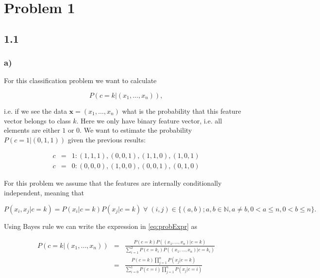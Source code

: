 \documentclass[table,xcdraw]{article}
\begin{document}




\section*{Problem 1}
\subsection*{1.1}

\subsubsection*{a)}

For this classification problem we want to calculate

\begin{equation}
P(c=k|(x_1,\dots,x_n)),
\label{eq:probExpr}
\end{equation}

i.e. if we see the data $\bm{x}=(x_1,\dots,x_n)$ what is the probability that this feature vector belongs to class $k$. Here we only have binary feature vector, i.e. all elements are either $1$ or $0$. We want to estimate the probability $P(c=1|(0,1,1))$ given the previous results:

\begin{equation*}
	\begin{array}{rcl}
		c & = & 1 : (1,1,1),(0,0,1),(1,1,0),(1,0,1) \\
		c & = & 0 : (0,0,0),(1,0,0),(0,0,1),(0,1,0)
	\end{array}
\end{equation*}

For this problem we assume that the features are internally conditionally independent, meaning that 

\begin{equation}
\label{eq:indeProb}
P(x_i,x_j|c=k)=P(x_i|c=k)P(x_j|c=k)\;\forall\;(i,j)\in\{(a,b); a,b \in \mathbb{N},a\neq b, 0 < a \leq n ,0 < b \leq n \}.
\end{equation}

Using Bayes rule we can write the expression in \eqref{eq:probExpr} as

\begin{equation}
	\begin{array}{rcl}
	P(c=k|(x_1,\dots,x_n)) & = & \displaystyle\frac{P(c=k)P((x_1,\dots,x_n)|c=k)}{\sum_{i=1}^{2}P(c=k_i)P((x_1,	\dots,x_n)|c=k_i)} \\[0.5cm]
	& = & \displaystyle\frac{P(c=k)\prod_{j=1}^{n}P(x_j|c=k)}{\sum_{i=0}^{1}P(c=i)\prod_{j=1}^{n}P(x_j|c=i)}
	\end{array}
	\label{eq:bayes}
\end{equation}
\end{document}
